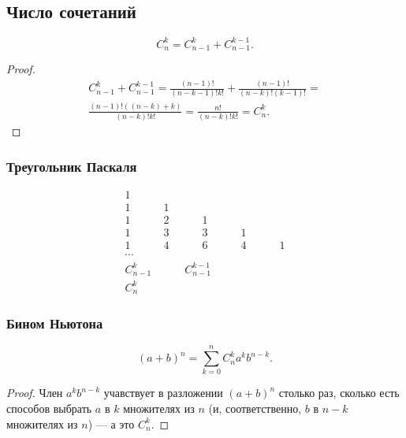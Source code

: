 \subsection{Число сочетаний}

\begin{theorem}
    \[ C_n^k = C_{n-1}^k + C_{n-1}^{k-1}. \]
\end{theorem}

\begin{proof}
    \begin{gather*}
        C_{n-1}^k + C_{n-1}^{k-1} = \frac{(n - 1)!}{(n - k - 1)!k!} + \frac{(n - 1)!}{(n - k)!(k - 1)!} =\\
        \frac{(n - 1)! ((n - k) + k)}{(n - k)! k!} = \frac{n!}{(n - k)! k!} = C_n^k.
    \end{gather*}
\end{proof}

\subsubsection*{Треугольник Паскаля}

\begin{gather*}
    1 \\
    1 \quad \quad \quad 1 \\
    1 \quad \quad \quad 2 \quad \quad \quad 1 \\
    1 \quad \quad \quad 3 \quad \quad \quad 3 \quad \quad \quad 1 \\
    1 \quad \quad \quad 4 \quad \quad \quad 6 \quad \quad \quad 4 \quad \quad \quad 1 \\
    \cdots\\
    C_{n-1}^k \quad \quad \quad C_{n-1}^{k-1}\\
    C_n^k
\end{gather*}

\subsubsection*{Бином Ньютона}

\begin{theorem}
    \[ (a + b)^n = \sum\limits_{k = 0}^n C_n^k a^k b^{n - k}. \]
\end{theorem}

\begin{proof}
    Член $a^k b^{n - k}$ учавствует в разложении $(a + b)^n$ столько раз, сколько есть способов выбрать $a$ в $k$ множителях из $n$ (и, соответственно, $b$ в $n - k$ множителях из $n$) ---  а это $C_n^k$.
\end{proof}